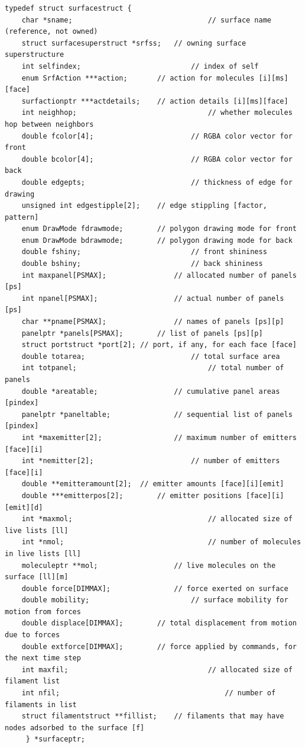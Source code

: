 \documentclass {scrbook}
\begin{document}
\begin{lstlisting}
typedef struct surfacestruct {
	char *sname;								// surface name (reference, not owned)
	struct surfacesuperstruct *srfss;	// owning surface superstructure
	int selfindex;							// index of self
	enum SrfAction ***action;		// action for molecules [i][ms][face]
	surfactionptr ***actdetails;	// action details [i][ms][face]
	int neighhop;								// whether molecules hop between neighbors
	double fcolor[4];						// RGBA color vector for front
	double bcolor[4];						// RGBA color vector for back
	double edgepts;							// thickness of edge for drawing
	unsigned int edgestipple[2];	// edge stippling [factor, pattern]
	enum DrawMode fdrawmode;		// polygon drawing mode for front
	enum DrawMode bdrawmode;		// polygon drawing mode for back
	double fshiny;							// front shininess
	double bshiny;							// back shininess
	int maxpanel[PSMAX];				// allocated number of panels [ps]
	int npanel[PSMAX];					// actual number of panels [ps]
	char **pname[PSMAX];				// names of panels [ps][p]
	panelptr *panels[PSMAX];		// list of panels [ps][p]
	struct portstruct *port[2];	// port, if any, for each face [face]
	double totarea;							// total surface area
	int totpanel;								// total number of panels
	double *areatable;					// cumulative panel areas [pindex]
	panelptr *paneltable;				// sequential list of panels [pindex]
	int *maxemitter[2];					// maximum number of emitters [face][i]
	int *nemitter[2];						// number of emitters [face][i]
	double **emitteramount[2];	// emitter amounts [face][i][emit]
	double ***emitterpos[2];		// emitter positions [face][i][emit][d]
	int *maxmol;								// allocated size of live lists [ll]
	int *nmol;									// number of molecules in live lists [ll]
	moleculeptr **mol;					// live molecules on the surface [ll][m]
	double force[DIMMAX];				// force exerted on surface
	double mobility;						// surface mobility for motion from forces
	double displace[DIMMAX];		// total displacement from motion due to forces
	double extforce[DIMMAX];		// force applied by commands, for the next time step
	int maxfil;									// allocated size of filament list
	int nfil;										// number of filaments in list
	struct filamentstruct **fillist;	// filaments that may have nodes adsorbed to the surface [f]
	 } *surfaceptr;
\end{lstlisting}
\end{document}
